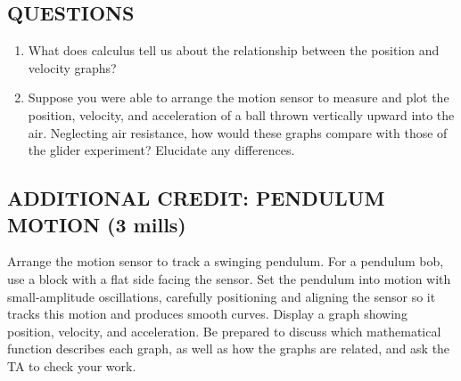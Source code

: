 \subsection*{QUESTIONS}

\begin{enumerate}[label=\alph*.]

\item What does calculus tell us about the relationship between the position and velocity graphs?

\item Suppose you were able to arrange the motion sensor to measure and plot the position, velocity, and acceleration of a ball thrown vertically upward into the air.  Neglecting air resistance, how would these graphs compare with those of the glider experiment?  Elucidate any differences.

\end{enumerate}

\subsection*{ADDITIONAL CREDIT: PENDULUM MOTION (3 mills)}

Arrange the motion sensor to track a swinging pendulum.  For a pendulum bob, use a block with a flat side facing the sensor.  Set the pendulum into motion with small-amplitude oscillations, carefully positioning and aligning the sensor so it tracks this motion and produces smooth curves.  Display a graph showing position, velocity, and acceleration.  Be prepared to discuss which mathematical function describes each graph, as well as how the graphs are related, and ask the TA to check your work.
